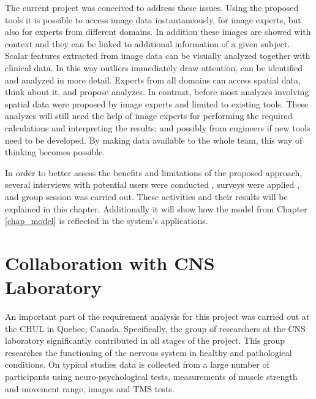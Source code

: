 The current project was conceived to address these issues. Using the proposed tools it is possible to access image data instantaneously,  for image experts, but also for experts from different domains. In addition these images are showed with context and they can be linked to additional information of a given subject. Scalar features extracted from image data can be visually analyzed together with clinical data. In this way outliers immediately draw attention, can be identified and analyzed in more detail. Experts from all domains can access spatial data, think about it, and propose analyzes. In contrast, before most analyzes involving spatial data were proposed by image experts and limited to existing tools. These analyzes will still need the help of image experts for performing the required calculations and interpreting the results; and possibly from engineers if new tools need to be developed. By making data available to the whole team, this way of thinking becomes possible.    

In order to better assess the benefits and limitations of the proposed approach, several interviews with potential users were conducted , surveys were applied , and group session was carried out. These activities and their results will be explained in this chapter. Additionally it will show how the model from Chapter \ref{chap_model} is reflected in the system's applications.	


\section{Collaboration with CNS Laboratory}

An important part of the requirement analysis for this project was carried out at the CHUL in Quebec, Canada. Specifically, the group of researchers at the CNS laboratory significantly contributed in all stages of the project. This group researches the functioning of the nervous system in healthy and pathological conditions. On typical studies data is collected from a large number of participants using neuro-psychological tests, measurements of muscle strength and movement range, images and TMS tests. 


